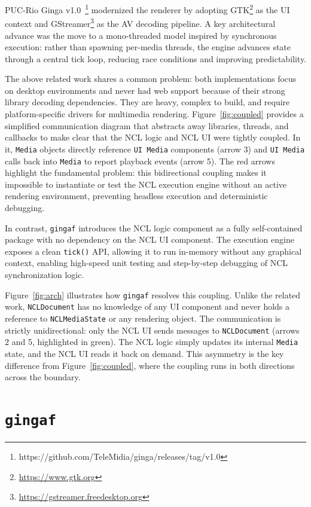 \documentclass[sigconf]{acmart}
\newcommand{\projectname}{\texttt{gingaf}}
\begin{document}
PUC-Rio Ginga v1.0~\cite{dodsworth2018dynamic}\footnote{https://github.com/TeleMidia/ginga/releases/tag/v1.0} modernized the renderer by adopting GTK\footnote{\url{https://www.gtk.org}} as the UI context and GStreamer\footnote{\url{https://gstreamer.freedesktop.org}} as the AV decoding pipeline. A key architectural advance was the move to a mono-threaded model inspired by synchronous execution: rather than spawning per-media threads, the engine advances state through a central tick loop, reducing race conditions and improving predictability.

The above related work shares a common problem: both implementations focus on desktop environments and never had web support because of their strong library decoding dependencies. They are heavy, complex to build, and require platform-specific drivers for multimedia rendering. Figure~\ref{fig:coupled} provides a simplified communication diagram that abstracts away libraries, threads, and callbacks to make clear that the NCL logic and NCL UI were tightly coupled. In it, \texttt{Media} objects directly reference \texttt{UI Media} components (arrow 3) and \texttt{UI Media} calls back into \texttt{Media} to report playback events (arrow 5). The red arrows highlight the fundamental problem: this bidirectional coupling makes it impossible to instantiate or test the NCL execution engine without an active rendering environment, preventing headless execution and deterministic debugging.

In contrast, \projectname{} introduces the NCL logic component as a fully self-contained package with no dependency on the NCL UI component. The execution engine exposes a clean \texttt{tick()} API, allowing it to run in-memory without any graphical context, enabling high-speed unit testing and step-by-step debugging of NCL synchronization logic.

Figure~\ref{fig:arch} illustrates how \projectname{} resolves this coupling. Unlike the related work, \texttt{NCLDocument} has no knowledge of any UI component and never holds a reference to \texttt{NCLMediaState} or any rendering object. The communication is strictly unidirectional: only the NCL UI sends messages to \texttt{NCLDocument} (arrows 2 and 5, highlighted in green). The NCL logic simply updates its internal \texttt{Media} state, and the NCL UI reads it back on demand. This asymmetry is the key difference from Figure~\ref{fig:coupled}, where the coupling runs in both directions across the boundary.


\section{\projectname{}}
\end{document}
